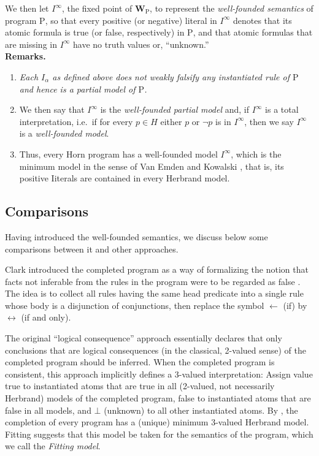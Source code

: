 We then let $I^\infty$, the fixed point of $\mathbf{W}_\mathrm{P}$, to represent the \emph{well-founded semantics} of program $\mathrm{P}$, so that every positive (or negative) literal in $I^\infty$ denotes that its atomic formula is true (or false, respectively) in $\mathrm{P}$, and that atomic formulas that are missing in $I^\infty$ have no truth values or, ``unknown.''
\medskip\\
\textbf{Remarks.}
\begin{enumerate}[label=(\alph*)]
%
\item \emph{Each $I_\alpha$ as defined above does not weakly falsify any instantiated rule of $\mathrm{P}$ and hence is a partial model of $\mathrm{P}$.}
%
\item We then say that $I^\infty$ is the \emph{well-founded partial model} and, if $I^\infty$ is a total interpretation, i.e.\ if for every $p \in H$ either $p$ or $\neg p$ is in $I^\infty$, then we say $I^\infty$ is a \emph{well-founded model}.
%
\item Thus, every Horn program has a well-founded model $I^\infty$, which is the minimum model in the sense of Van Emden and Kowalski \cite{VanEmden}, that is, its positive Iiterals are contained in every Herbrand model.
%
\end{enumerate}
\subsection{Comparisons}
Having introduced the well-founded semantics, we discuss below some comparisons between it and other approaches.

Clark introduced the completed program as a way of formalizing the notion that facts not inferable from the rules in the program were to be regarded as false \cite{Clark}. The idea is to collect all rules having the same head predicate into a single rule whose body is a disjunction of conjunctions, then replace the symbol $\leftarrow$ (if) by $\leftrightarrow$ (if and only).

The original ``logical consequence'' approach essentially declares that only conclusions that are logical consequences (in the classical, 2-valued sense) of the completed program should be inferred. When the completed program is consistent, this approach implicitly defines a 3-valued interpretation: Assign value true to instantiated atoms that are true in all (2-valued, not necessarily Herbrand) models of the completed program, false to instantiated atoms that are false in all models, and $\bot$ (unknown) to all other instantiated atoms. By \cite{fitting2}, the completion of every program has a (unique) minimum 3-valued Herbrand model. Fitting suggests that this model be taken for the semantics of the program, which we call the \emph{Fitting model}. 

